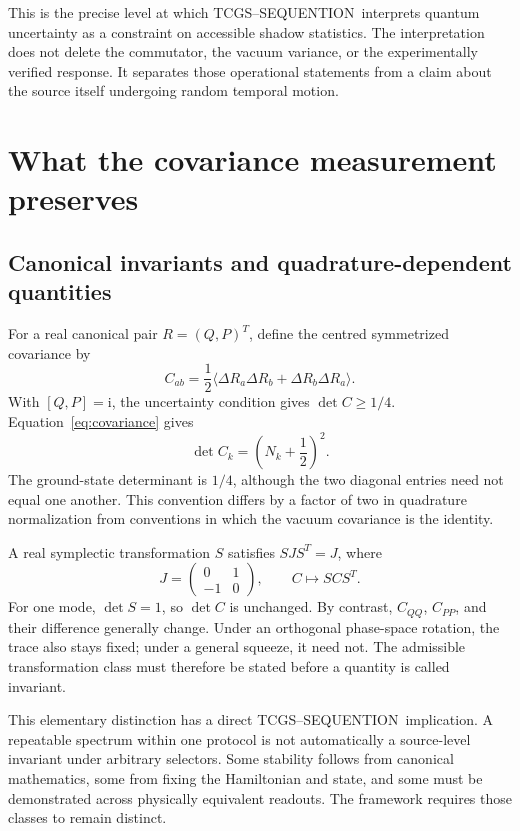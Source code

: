 \documentclass[11pt,a4paper]{article}
\theoremstyle{definition}
\theoremstyle{remark}
\newcommand{\TCGS}{TCGS--SEQUENTION}
\newcommand{\ii}{\mathrm{i}}
\begin{document}
This is the precise level at which \TCGS\ interprets quantum uncertainty as a constraint on accessible shadow statistics. The interpretation does not delete the commutator, the vacuum variance, or the experimentally verified response. It separates those operational statements from a claim about the source itself undergoing random temporal motion.\cite{foundation,born}

\section{What the covariance measurement preserves}
\label{sec:covariance}
\subsection{Canonical invariants and quadrature-dependent quantities}
For a real canonical pair $R=(Q,P)^T$, define the centred symmetrized covariance by
\begin{equation}
 C_{ab}=\frac12\langle\Delta R_a\Delta R_b+\Delta R_b\Delta R_a\rangle.
 \label{eq:Cdefinition}
\end{equation}
With $[Q,P]=\ii$, the uncertainty condition gives $\det C\geq1/4$. Equation~\eqref{eq:covariance} gives
\begin{equation}
 \det C_k=\left(N_k+\frac12\right)^2.
 \label{eq:detC}
\end{equation}
The ground-state determinant is $1/4$, although the two diagonal entries need not equal one another. This convention differs by a factor of two in quadrature normalization from conventions in which the vacuum covariance is the identity.\cite{weedbrook}

A real symplectic transformation $S$ satisfies $SJS^T=J$, where
\begin{equation}
 J=\begin{pmatrix}0&1\\-1&0\end{pmatrix},\qquad C\longmapsto SCS^T.
 \label{eq:symplectic}
\end{equation}
For one mode, $\det S=1$, so $\det C$ is unchanged. By contrast, $C_{QQ}$, $C_{PP}$, and their difference generally change. Under an orthogonal phase-space rotation, the trace also stays fixed; under a general squeeze, it need not. The admissible transformation class must therefore be stated before a quantity is called invariant.\cite{weedbrook}

This elementary distinction has a direct \TCGS\ implication. A repeatable spectrum within one protocol is not automatically a source-level invariant under arbitrary selectors. Some stability follows from canonical mathematics, some from fixing the Hamiltonian and state, and some must be demonstrated across physically equivalent readouts. The framework requires those classes to remain distinct.\cite{foundation,planck}
\end{document}
